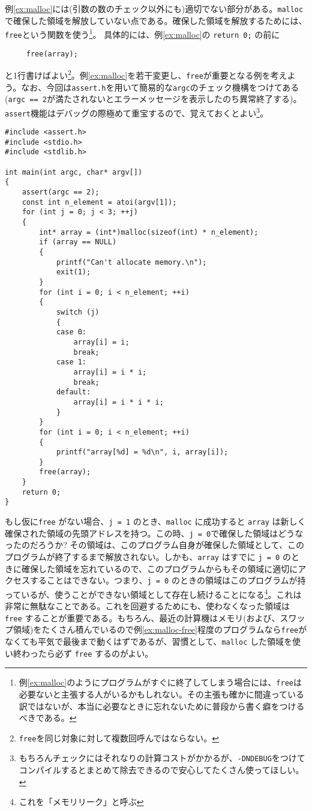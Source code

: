 例\ref{ex:malloc}には(引数の数のチェック以外にも)適切でない部分がある。\texttt{malloc}で確保した領域を解放していない点である。確保した領域を解放するためには、\texttt{free}という関数を使う\footnote{例\ref{ex:malloc}のようにプログラムがすぐに終了してしまう場合には、\texttt{free}は必要ないと主張する人がいるかもしれない。その主張も確かに間違っている訳ではないが、本当に必要なときに忘れないために普段から書く癖をつけるべきである。}。
具体的には、例\ref{ex:malloc}の \texttt{return 0;} の前に
\begin{verbatim}
     free(array);
\end{verbatim}
と1行書けばよい\footnote{\texttt{free}を同じ対象に対して複数回呼んではならない。}。例\ref{ex:malloc}を若干変更し、\texttt{free}が重要となる例を考えよう。なお、今回は\texttt{assert.h}を用いて簡易的な\texttt{argc}のチェック機構をつけてある(\texttt{argc == 2}が満たされないとエラーメッセージを表示したのち異常終了する)。
\texttt{assert}機能はデバッグの際極めて重宝するので、覚えておくとよい\footnote{もちろんチェックにはそれなりの計算コストがかかるが、\texttt{-DNDEBUG}をつけてコンパイルするとまとめて除去できるので安心してたくさん使ってほしい。}。
\begin{reidai}\label{ex:malloc-free}
    \begin{verbatim}
#include <assert.h>
#include <stdio.h>
#include <stdlib.h>

int main(int argc, char* argv[])
{
    assert(argc == 2);
    const int n_element = atoi(argv[1]);
    for (int j = 0; j < 3; ++j)
    {
        int* array = (int*)malloc(sizeof(int) * n_element);
        if (array == NULL)
        {
            printf("Can't allocate memory.\n");
            exit(1);
        }
        for (int i = 0; i < n_element; ++i)
        {
            switch (j)
            {
            case 0:
                array[i] = i;
                break;
            case 1:
                array[i] = i * i;
                break;
            default:
                array[i] = i * i * i;
            }
        }
        for (int i = 0; i < n_element; ++i)
        {
            printf("array[%d] = %d\n", i, array[i]);
        }
        free(array);
    }
    return 0;
}
\end{verbatim}
\end{reidai} \noindent
もし仮に\texttt{free} がない場合、\texttt{j = 1} のとき、\texttt{malloc} に成功すると \texttt{array} は新しく確保された領域の先頭アドレスを持つ。この時、\texttt{j = 0}で確保した領域はどうなったのだろうか? その領域は、このプログラム自身が確保した領域として、このプログラムが終了するまで解放されない。しかも、\texttt{array} はすでに \texttt{j = 0} のときに確保した領域を忘れているので、このプログラムからもその領域に適切にアクセスすることはできない。つまり、\texttt{j = 0} のときの領域はこのプログラムが持っているが、使うことができない領域として存在し続けることになる\footnote{これを「メモリリーク」と呼ぶ}。これは非常に無駄なことである。これを回避するためにも、使わなくなった領域は \texttt{free} することが重要である。もちろん、最近の計算機はメモリ(および、スワップ領域)をたくさん積んでいるので例\ref{ex:malloc-free}程度のプログラムなら\texttt{free}がなくても平気で最後まで動くはずであるが、習慣として、\texttt{malloc} した領域を使い終わったら必ず \texttt{free} するのがよい。

